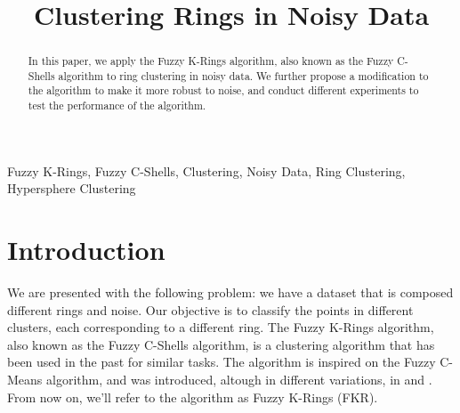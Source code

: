 \documentclass[conference]{IEEEtran}
\begin{document}
\title{Clustering Rings in Noisy Data}

\author{

}
\maketitle

\begin{abstract}
In this paper, we apply the Fuzzy K-Rings algorithm, also known as the Fuzzy C-Shells algorithm to ring clustering in noisy data.
We further propose a modification to the algorithm to make it more robust to noise, and conduct different experiments to test the performance of the algorithm.
\end{abstract}

\begin{IEEEkeywords}
Fuzzy K-Rings, Fuzzy C-Shells, Clustering, Noisy Data, Ring Clustering, Hypersphere Clustering
\end{IEEEkeywords}

\section{Introduction}
We are presented with the following problem: we have a dataset that is composed different rings and noise. Our objective is to classify the points in different clusters,
each corresponding to a different ring. The Fuzzy K-Rings algorithm, also known as the Fuzzy C-Shells algorithm, is a clustering algorithm that has been used in the past
for similar tasks. The algorithm is inspired on the Fuzzy C-Means algorithm, and was introduced, altough in different variations, in \cite{308484} and \cite{DAVE1992713}.
From now on, we'll refer to the algorithm as Fuzzy K-Rings (FKR).
\end{document}
